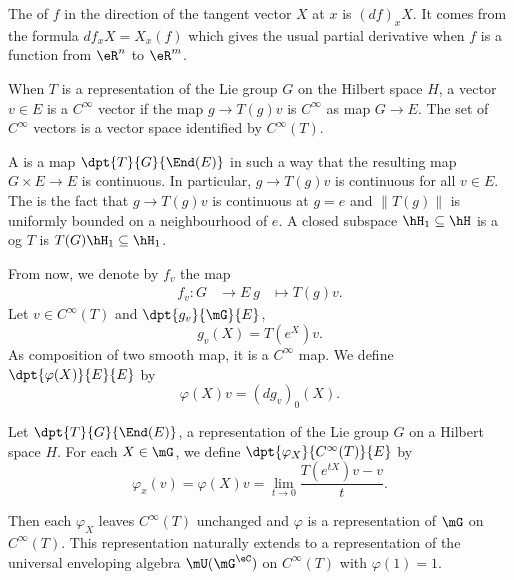 The  of $f$ in the direction of the tangent vector $X$ at $x$ is $(df)_xX$. It comes from the formula $df_xX=X_x(f)$ which gives the usual partial derivative when $f$ is a function from $\eR^n$ to $\eR^m$.

When $T$ is a representation of the Lie group $G$ on the Hilbert space $H$, a vector $v\in E$ is a $ C^{\infty}$ vector if the map $g\to T(g)v$ is $ C^{\infty}$ as map $G\to E$. The set of $ C^{\infty}$ vectors is a vector space identified by $ C^{\infty}(T)$.

A  is a map $\dpt{ T }{ G }{ \End(E) }$ in such a way that the resulting map $G\times E\to E$ is continuous. In particular, $g\to T(g)v$ is continuous for all $v\in E$. The  is the fact that $g\to T(g)v$ is continuous at $g=e$ and $\| T(g) \|$ is uniformly bounded on a neighbourhood of $e$. A closed subspace $\hH_1\subseteq\hH$ is a  og $T$ is $T(G)\hH_1\subseteq \hH_1$. 

From now, we denote by $f_v$ the map 
		\begin{equation}
		\begin{aligned}
			 f_v  \colon G &\to E\
			g&\mapsto T(g)v.
		\end{aligned}
	\end{equation}	
Let $v\in C^{\infty}(T)$ and $\dpt{g_v}{\mG}{E}$, 
\[ 
  g_v(X)=T(e^X)v.
\]
As composition of two smooth map, it is a $ C^{\infty}$ map. We define $\dpt{\varphi(X)}{E}{E}$ by
\[ 
  \varphi(X)v=(dg_v)_0(X).
\]

\begin{proposition}
Let $\dpt{T}{G}{\End(E)}$, a representation of the Lie group $G$ on a Hilbert space $H$. For each  $X\in\mG$, we define $\dpt{\varphi_X}{C^{\infty}(T)}{E}$ by
\begin{equation} \label{eq:250105r1}
   \varphi_x(v)=\varphi(X)v=\lim_{t\to 0}\frac{T(e^{tX})v-v}{t}.
\end{equation}

Then  each $\varphi_X$ leaves $ C^{\infty}(T)$ unchanged and $\varphi$ is a representation of $\mG$ on $ C^{\infty}(T)$. This representation naturally extends to a representation of the universal enveloping algebra $\mU(\mG^{\eC})$ on $ C^{\infty}(T)$ with $\varphi(1)=1$.

\end{proposition}

